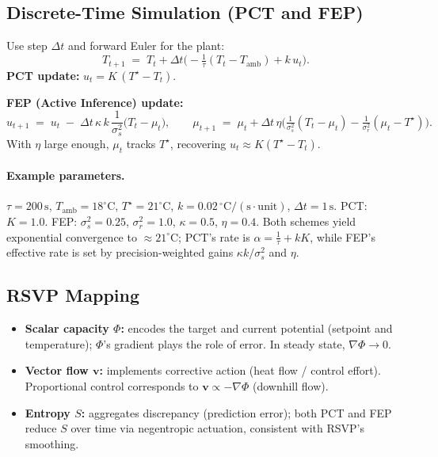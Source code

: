 \documentclass[a4paper,11pt,openany]{book}
\begin{document}
\subsection{Discrete-Time Simulation (PCT and FEP)}

Use step $\Delta t$ and forward Euler for the plant:
\[
T_{t+1} \;=\; T_t + \Delta t\Big(-\tfrac{1}{\tau}(T_t - T_{\mathrm{amb}}) + k\,u_t\Big).
\]
\textbf{PCT update:} $u_t = K\,(T^\star - T_t)$.

\noindent\textbf{FEP (Active Inference) update:}
\[
u_{t+1} \;=\; u_t \;-\; \Delta t\,\kappa\,k\,\frac{1}{\sigma_s^2}\big(T_t - \mu_t\big), 
\qquad
\mu_{t+1} \;=\; \mu_t + \Delta t\,\eta\Big(\tfrac{1}{\sigma_s^2}(T_t-\mu_t) - \tfrac{1}{\sigma_r^2}(\mu_t - T^\star)\Big).
\]
With $\eta$ large enough, $\mu_t$ tracks $T^\star$, recovering $u_t \approx K(T^\star - T_t)$.

\paragraph{Example parameters.} 
$\tau=200\,\mathrm{s}$, $T_{\mathrm{amb}}=18^\circ\mathrm{C}$, $T^\star=21^\circ\mathrm{C}$, $k=0.02\,^\circ\mathrm{C}/(\mathrm{s}\cdot\mathrm{unit})$, $\Delta t=1\,\mathrm{s}$.  
PCT: $K=1.0$.  
FEP: $\sigma_s^2=0.25$, $\sigma_r^2=1.0$, $\kappa=0.5$, $\eta=0.4$.  
Both schemes yield exponential convergence to $\approx 21^\circ$C; PCT’s rate is $\alpha=\tfrac{1}{\tau}+kK$, while FEP’s effective rate is set by precision-weighted gains $\kappa k/\sigma_s^2$ and $\eta$.

\subsection{RSVP Mapping}

\begin{itemize}
  \item \textbf{Scalar capacity $\Phi$:} encodes the target and current potential (setpoint and temperature); $\Phi$’s gradient plays the role of error. In steady state, $\nabla\Phi\to 0$.
  \item \textbf{Vector flow $\mathbf{v}$:} implements corrective action (heat flow / control effort). Proportional control corresponds to $\mathbf{v}\propto -\nabla\Phi$ (downhill flow).
  \item \textbf{Entropy $S$:} aggregates discrepancy (prediction error); both PCT and FEP reduce $S$ over time via negentropic actuation, consistent with RSVP’s smoothing.
\end{itemize}
\end{document}
